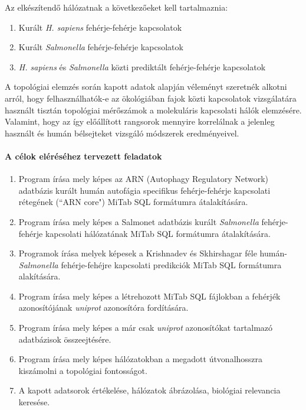 \documentclass[a4paper,12pt]{article}
\begin{document}
	
	Az elkészítendő hálózatnak a következőeket kell tartalmaznia:  
	\begin{enumerate}
			\item Kurált \textit{H. sapiens} fehérje-fehérje kapcsolatok
			\item Kurált \textit{Salmonella} fehérje-fehérje kapcsolatok
			\item \textit{H. sapiens} és \textit{Salmonella} közti prediktált fehérje-fehérje kapcsolatok
	\end{enumerate}
	
	A topológiai elemzés során kapott adatok alapján véleményt szeretnék alkotni arról, hogy felhasználhatók-e az ökológiában fajok közti kapcsolatok vizsgálatára használt tisztán topológiai mérőszámok a molekuláris kapcsolati hálók elemzésére. Valamint, hogy az így előállított rangsorok mennyire korrelálnak a jelenleg használt  és humán bélsejteket vizsgáló módszerek eredményeivel.

	\paragraph{A célok eléréséhez tervezett feladatok}
	\begin{enumerate}
		\item Program írása mely képes az ARN (Autophagy Regulatory Network) adatbázis kurált humán autofágia specifikus fehérje-fehérje kapcsolati rétegének (``ARN core") MiTab SQL formátumra átalakítására.
		\item Program írása mely képes a Salmonet adatbázis kurált \textit{Salmonella} fehérje-fehérje kapcsolati hálózatának MiTab SQL formátumra átalakítására.
		\item Programok írása melyek képesek a Krishnadev és Skhirshagar féle humán-\textit{Salmonella} fehérje-fehéjre kapcsolati predikciók MiTab SQL formátumra alakítására.
		\item Program írása mely képes a létrehozott MiTab SQL fájlokban a fehérjék azonosítójának \textit{uniprot} azonosítóra fordítására.
		\item Program írása mely képes a már csak \textit{uniprot} azonosítókat tartalmazó adatbázisok összeejtésére.
		\item Program írása mely képes hálózatokban a megadott útvonalhosszra kiszámolni a topológiai fontosságot.
		\item A kapott adatsorok értékelése, hálózatok ábrázolása, biológiai relevancia keresése.
	\end{enumerate}
\end{document}
